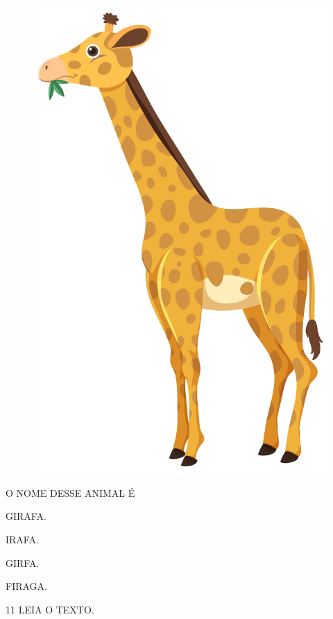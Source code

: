 \begin{minipage}{.5\textwidth}
\begin{figure}[H]
\centering
\includegraphics[width=.5\textwidth]{media/image219.jpg}
\end{figure}
\end{minipage}
\hspace{0.5cm}
\begin{minipage}{.5\textwidth}
O NOME DESSE ANIMAL É

\begin{escolha}
\item GIRAFA.

\item IRAFA.

\item GIRFA.

\item FIRAGA.
\end{escolha}
\end{minipage}

\vspace{0.5cm}

\num{11} LEIA O TEXTO.

